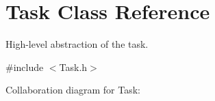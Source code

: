 \hypertarget{classTask}{}\section{Task Class Reference}
\label{classTask}


High-\/level abstraction of the task.  




{\ttfamily \#include $<$Task.\+h$>$}



Collaboration diagram for Task\+:
